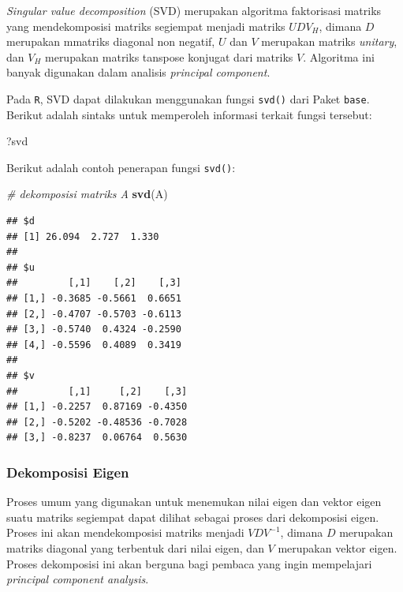 \documentclass[
]{book}
\newenvironment{Shaded}{\begin{snugshade}}{\end{snugshade}}
\newcommand{\CommentTok}[1]{\textcolor[rgb]{0.56,0.35,0.01}{\textit{#1}}}
\newcommand{\FunctionTok}[1]{\textcolor[rgb]{0.13,0.29,0.53}{\textbf{#1}}}
\newcommand{\NormalTok}[1]{#1}
\theoremstyle{definition}
\theoremstyle{definition}
\theoremstyle{definition}
\theoremstyle{definition}
\theoremstyle{remark}
\begin{document}
\emph{Singular value decomposition} (SVD) merupakan algoritma faktorisasi matriks yang mendekomposisi matriks segiempat menjadi matriks \(UDV_H\), dimana \(D\) merupakan mmatriks diagonal non negatif, \(U\) dan \(V\) merupakan matriks \emph{unitary}, dan \(V_H\) merupakan matriks tanspose konjugat dari matriks \(V\). Algoritma ini banyak digunakan dalam analisis \emph{principal component}.

Pada \texttt{R}, SVD dapat dilakukan menggunakan fungsi \texttt{svd()} dari Paket \texttt{base}. Berikut adalah sintaks untuk memperoleh informasi terkait fungsi tersebut:

\begin{Shaded}
\begin{Highlighting}[]
\NormalTok{?svd}
\end{Highlighting}
\end{Shaded}

Berikut adalah contoh penerapan fungsi \texttt{svd()}:

\begin{Shaded}
\begin{Highlighting}[]
\CommentTok{\# dekomposisi matriks A}
\FunctionTok{svd}\NormalTok{(A)}
\end{Highlighting}
\end{Shaded}

\begin{verbatim}
## $d
## [1] 26.094  2.727  1.330
## 
## $u
##         [,1]    [,2]    [,3]
## [1,] -0.3685 -0.5661  0.6651
## [2,] -0.4707 -0.5703 -0.6113
## [3,] -0.5740  0.4324 -0.2590
## [4,] -0.5596  0.4089  0.3419
## 
## $v
##         [,1]     [,2]    [,3]
## [1,] -0.2257  0.87169 -0.4350
## [2,] -0.5202 -0.48536 -0.7028
## [3,] -0.8237  0.06764  0.5630
\end{verbatim}

\hypertarget{eigendecomp}{%
\subsubsection{Dekomposisi Eigen}\label{eigendecomp}}

Proses umum yang digunakan untuk menemukan nilai eigen dan vektor eigen suatu matriks segiempat dapat dilihat sebagai proses dari dekomposisi eigen. Proses ini akan mendekomposisi matriks menjadi \(VDV^{-1}\), dimana \(D\) merupakan matriks diagonal yang terbentuk dari nilai eigen, dan \(V\) merupakan vektor eigen. Proses dekomposisi ini akan berguna bagi pembaca yang ingin mempelajari \emph{principal component analysis}.
\end{document}
